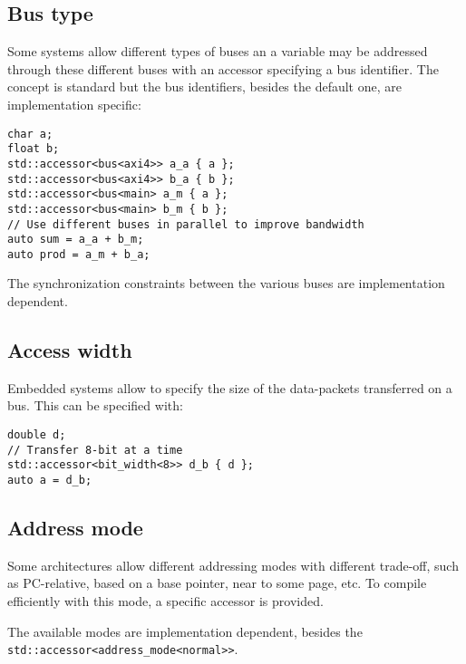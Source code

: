 \documentclass[a4paper]{article}
\begin{document}


\subsection{Bus type}
\label{sec:bus-type}

Some systems allow different types of buses an a variable may be
addressed through these different buses with an accessor specifying a
bus identifier. The concept is standard but the bus identifiers,
besides the default one, are implementation specific:
\begin{lstlisting}
char a;
float b;
std::accessor<bus<axi4>> a_a { a };
std::accessor<bus<axi4>> b_a { b };
std::accessor<bus<main> a_m { a };
std::accessor<bus<main> b_m { b };
// Use different buses in parallel to improve bandwidth
auto sum = a_a + b_m;
auto prod = a_m + b_a;
\end{lstlisting}

The synchronization constraints between the various buses are
implementation dependent.


\subsection{Access width}
\label{sec:access-width}

Embedded systems allow to specify the size of the data-packets
transferred on a bus. This can be specified with:
\begin{lstlisting}
double d;
// Transfer 8-bit at a time
std::accessor<bit_width<8>> d_b { d };
auto a = d_b;
\end{lstlisting}


\subsection{Address mode}
\label{sec:address-mode}

Some architectures allow different addressing modes with different
trade-off, such as PC-relative, based on a base pointer, near to some
page, etc. To compile efficiently with this mode, a specific accessor
is provided.

The available modes are implementation dependent, besides the
\lstinline|std::accessor<address_mode<normal>>|.


\end{document}

